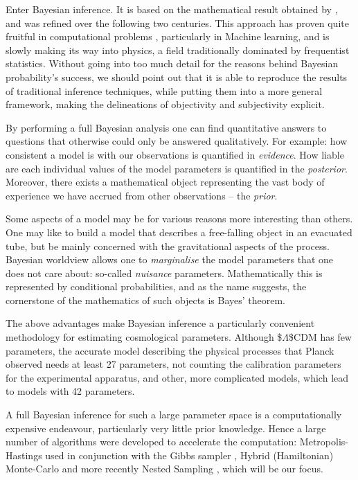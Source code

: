 \documentclass[usenatbib]{mnras}
\begin{document}
Enter Bayesian inference. It is based on the mathematical result
obtained by \cite{1763}, and was refined over the following two
centuries. This approach has proven quite fruitful in computational
problems \citep{Wolpert2004}, particularly in Machine learning, and is
slowly making its way into physics, a field traditionally dominated
by frequentist statistics. Without going into too much detail for
the reasons behind Bayesian probability's success, we should point
out that it is able to reproduce the results of traditional
inference techniques, while putting them into a more general
framework, making the delineations of objectivity and subjectivity
explicit.


By performing a full Bayesian analysis one can find quantitative
answers to questions that otherwise could only be answered
qualitatively.  For example: how consistent a model is with our
observations is quantified in \emph{evidence}. How liable are each
individual values of the model parameters is quantified in the
\emph{posterior}. Moreover, there exists a mathematical object
representing  the vast body of experience we  have accrued from
other observations -- the \emph{prior}. 

Some aspects of a model may be for various reasons more interesting
than others. One may like to build a model that describes a
free-falling object in an evacuated tube, but be mainly concerned
with the gravitational aspects of the process. Bayesian worldview
allows one to \emph{marginalise} the model parameters that one does not
care about: so-called \emph{nuisance} parameters. Mathematically this is
represented by conditional probabilities, and as the name suggests,
the cornerstone of the mathematics of such objects is Bayes'
theorem. 

The above advantages make Bayesian inference a particularly
convenient methodology for estimating cosmological
parameters. Although \$\(\Lambda\)\$CDM has few parameters, the accurate
model describing the physical processes that Planck \citep{planck}
observed needs at least 27 parameters, not counting the calibration
parameters for the experimental apparatus, and other, more
complicated models, which lead to models with 42 parameters.

A full Bayesian inference for such a large parameter space is a
computationally expensive endeavour, particularly very little prior
knowledge. Hence a large number of algorithms were developed to
accelerate the computation: Metropolis-Hastings \citep{Metropolis}
used in conjunction with the Gibbs sampler
\citep{Metropolis-hastings-gibbs}, Hybrid (Hamiltonian) Monte-Carlo
\citep{1701.02434,Duane_1987} and more recently Nested Sampling
\citep{skilling2006}, which will be our focus.
\end{document}

